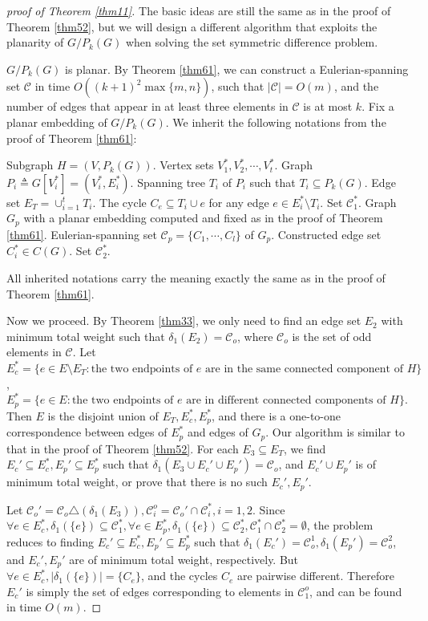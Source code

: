 \documentclass[10pt,fleqn]{article}
\newcommand{\rs}{\setminus}
\newcommand{\mc}[1]{\mathcal{#1}}
\begin{document}
	\begin{proof}[\it{proof of Theorem \ref{thm11}}]
		The basic ideas are still the same as in the proof of Theorem \ref{thm52}, but we will design a different algorithm that exploits the planarity of $G/P_k(G)$ when solving the set symmetric difference problem. \par 
		$G/ P_k(G)$ is planar. By Theorem \ref{thm61}, we can construct a Eulerian-spanning set $\mc{C}$ in time $O((k+1)^2\max\{m,n\})$, such that $|\mc{C}|=O(m)$, and the number of edges that appear in at least three elements in $\mc{C}$ is at most $k$. Fix a planar embedding of $G/ P_k(G)$. We inherit the following notations from the proof of Theorem \ref{thm61}: \par 
		Subgraph $H=(V,P_k(G))$. Vertex sets $V_1^*,V_2^*,\cdots,V_t^*$. Graph $P_i\triangleq G[V_i^*]=(V_i^*,E_i^*)$. Spanning tree $T_i$ of $P_i$ such that $T_i\subseteq P_k(G)$. Edge set $E_T=\cup_{i=1}^tT_i$. The cycle $C_e\subseteq T_i\cup e$ for any edge $e\in E_i^*\rs T_i$. Set $\mc{C}_1^*$. Graph $G_p$ with a planar embedding computed and fixed as in the proof of Theorem \ref{thm61}. Eulerian-spanning set $\mc{C}_p=\{C_1,\cdots,C_l\}$ of $G_p$. Constructed edge set $C_i^*\in C(G)$. Set $\mc{C}_2^*$. \par
		All inherited notations carry the meaning exactly the same as in the proof of Theorem \ref{thm61}. \par
		Now we proceed. By Theorem \ref{thm33}, we only need to find an edge set $E_2$ with minimum total weight such that $\delta_1(E_2)=\mc{C}_o$, where $\mc{C}_o$ is the set of odd elements in $\mc{C}$. Let 
		$E_c^*=\{e\in E\rs E_T:\text{the two endpoints of $e$ are in the same connected component of }H\}$,
		$E_p^*=\{e\in E:\text{the two endpoints of $e$ are in different connected components of }H\}$.
		Then $E$ is the disjoint union of $E_T,E_c^*,E_p^*$, and there is a one-to-one correspondence between edges of $E_p^*$ and edges of $G_p$. Our algorithm is similar to that in the proof of Theorem \ref{thm52}. For each $E_3\subseteq E_T$, we find $E_{c}'\subseteq E_c^*,E_{p}'\subseteq E_p^*$ such that $\delta_1(E_3\cup E_c'\cup E_p')=\mc{C}_o$, and $E_c'\cup E_p'$ is of minimum total weight, or prove that there is no such $E_c',E_p'$. \par
		Let $\mc{C}_o'=\mc{C}_o\triangle(\delta_1(E_3)),\mc{C}_i^o=\mc{C}_o'\cap\mc{C}_i^*,i=1,2$. Since $\forall e\in E_c^*,\delta_1(\{e\})\subseteq\mc{C}_1^*,\forall e\in E_p^*,\delta_1(\{e\})\subseteq\mc{C}_2^*,\mc{C}_1^*\cap\mc{C}_2^*=\emptyset$, the problem reduces to finding $E_{c}'\subseteq E_c^*,E_{p}'\subseteq E_p^*$ such that $\delta_1(E_c')=\mc{C}_o^1,\delta_1(E_p')=\mc{C}_o^2$, and $E_c',E_p'$ are of minimum total weight, respectively. But $\forall e\in E_c^*,|\delta_1(\{e\})|=\{C_e\}$, and the cycles $C_e$ are pairwise different. Therefore $E_c'$ is simply the set of edges corresponding to elements in $\mc{C}_1^o$, and can be found in time $O(m)$. \par

\end{proof}
\end{document}
